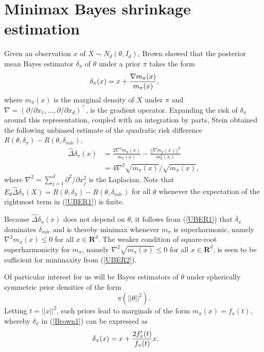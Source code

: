 \documentclass[11pt]{article}
\theoremstyle{definition}
\begin{document}
\section{Minimax Bayes shrinkage estimation}
\label{Shrinkage estimation section}
Given an observation $x$ of $X \sim N_d(\theta,I_d)$, Brown \cite{Brown1971} showed that the posterior mean Bayes estimator $\delta_{\pi}$ of $\theta$ under a prior $\pi$ takes the form
\begin{align} \label{Brown1}
   \delta_{\pi}(x) = x + \frac{\nabla m_{\pi}(x)}{m_{\pi}(x)},\; \hspace{8mm} 
\end{align}
where $m_{\pi}(x)$ is the marginal density of $X$ under $\pi$ and $\nabla = (\partial/\partial x_1,\ldots, \partial/\partial x_d)^{\top}$, is the gradient operator.  Expanding the risk of $\delta_{\pi}$  around this representation, coupled with an integration by parts, Stein \cite{s1981} obtained the following unbiased estimate of  the quadratic risk difference $R(\theta,\delta_\pi) - R(\theta, \delta_{mle})$, 
\begin{align} \label {UBER1}
   \hat{\Delta}\delta_\pi(x) & = \frac{2\nabla^2 m_{\pi}(x)}{m_{\pi}(x)} - \frac{||\nabla m_{\pi}(x)||^2}{m_{\pi}^2(x)} \\
  \label {UBER2} & = 4\nabla^2 \sqrt{m_\pi(x)}/\sqrt{m_\pi(x)},
\end{align}
where $\nabla^2 = \sum\limits_{j = 1}^{d}\partial^2/\partial x_j^2$ is the Laplacian.  Note that $E_\theta   \hat{\Delta}\delta_\pi(X)  = R(\theta,\delta_\pi) - R(\theta, \delta_{mle})$  for all $\theta$ whenever  the expectation of the rightmost term in (\ref{UBER1}) is finite.  

Because $\hat{\Delta}\delta_\pi(x)$ does not depend on $\theta$, it follows from (\ref{UBER1}) that $\delta_\pi$ dominates $\delta_{mle}$ and is thereby minimax whenever $m_{\pi}$ is superharmonic, namely $\nabla^2 m_{\pi}(x) \leq 0$ for all $x \in \mathbf{R}^d$.  The weaker condition of square-root superharmonicity for $m_{\pi}$, namely $\nabla^2 \sqrt{m_{\pi}(x)} \leq 0$  for all $x \in \mathbf{R}^d$, is seen to be  sufficient for minimaxity from (\ref{UBER2}).

Of particular interest for us will be Bayes estimators of $\theta$ under spherically symmetric prior densities of the form 
 \begin{equation}
    \nonumber \pi(||\theta||^2).
 \end{equation}
Letting $t = ||x||^2$,  such priors lead to marginals of the form $m_{\pi}(x) = f_{\pi}(t)$, whereby  $\delta_{\pi}$ in (\ref{Brown1})  can be expressed as
 \begin{align} \label{Brown2}
   \delta_{\pi}(x) = x + \frac{2f_{\pi}'(t)}{f_{\pi}(t)} x. \hspace{8mm} 
\end{align}
\end{document}
